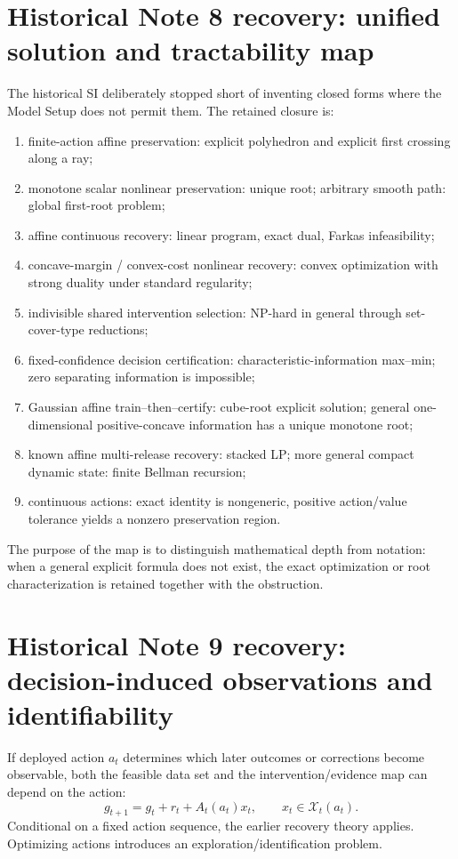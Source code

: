 \documentclass[11pt,letterpaper]{article}
\theoremstyle{plain}
\newcommand{\1}{\mathbf 1}
\begin{document}
\section{Historical Note 8 recovery: unified solution and tractability map}
The historical SI deliberately stopped short of inventing closed forms where the Model Setup does not permit them. The retained closure is:
\begin{enumerate}[leftmargin=1.4em]
\item finite-action affine preservation: explicit polyhedron and explicit first crossing along a ray;
\item monotone scalar nonlinear preservation: unique root; arbitrary smooth path: global first-root problem;
\item affine continuous recovery: linear program, exact dual, Farkas infeasibility;
\item concave-margin / convex-cost nonlinear recovery: convex optimization with strong duality under standard regularity;
\item indivisible shared intervention selection: NP-hard in general through set-cover-type reductions;
\item fixed-confidence decision certification: characteristic-information max--min; zero separating information is impossible;
\item Gaussian affine train--then--certify: cube-root explicit solution; general one-dimensional positive-concave information has a unique monotone root;
\item known affine multi-release recovery: stacked LP; more general compact dynamic state: finite Bellman recursion;
\item continuous actions: exact identity is nongeneric, positive action/value tolerance yields a nonzero preservation region.
\end{enumerate}
The purpose of the map is to distinguish mathematical depth from notation: when a general explicit formula does not exist, the exact optimization or root characterization is retained together with the obstruction.

\clearpage
\section{Historical Note 9 recovery: decision-induced observations and identifiability}
If deployed action $a_t$ determines which later outcomes or corrections become observable, both the feasible data set and the intervention/evidence map can depend on the action:
\begin{equation}
 g_{t+1}=g_t+r_t+A_t(a_t)x_t,\qquad x_t\in\mathcal X_t(a_t).
\end{equation}
Conditional on a fixed action sequence, the earlier recovery theory applies. Optimizing actions introduces an exploration/identification problem.
\end{document}
